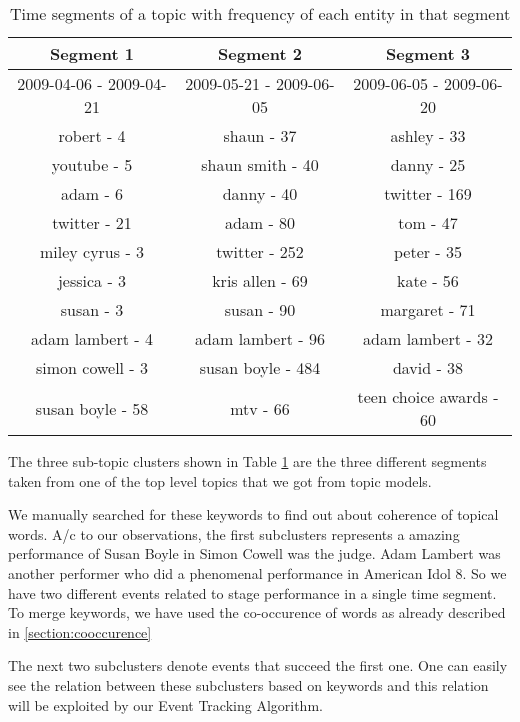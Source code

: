 \begin{table}[h!]
\centering
\begin{tabular}{ c c c }
\hline
Segment 1 & Segment 2 & Segment 3 \\
\hline
2009-04-06 - 2009-04-21& 2009-05-21 - 2009-06-05 & 2009-06-05 - 2009-06-20 \\
\hline
robert - 4 & shaun - 37  & ashley - 33  \\
youtube - 5 & shaun smith - 40  & danny - 25  \\
adam - 6 & danny - 40  & twitter - 169  \\
twitter - 21 & adam - 80  & tom - 47  \\
miley cyrus - 3 & twitter - 252  & peter - 35  \\
jessica - 3 & kris allen - 69  & kate - 56  \\
susan - 3 & susan - 90  & margaret - 71  \\
adam lambert - 4 & adam lambert - 96  & adam lambert - 32  \\
simon cowell - 3 & susan boyle - 484  & david - 38  \\
susan boyle - 58 & mtv - 66  & teen choice awards - 60 \\	
\end{tabular}
\caption{Time segments of a topic with frequency of each entity in that segment}
\label{table:timesegment}
\end{table}


The three sub-topic clusters shown in Table \ref{table:timesegment} are the three different segments taken from one of the top level topics that we got from topic models. 

We manually searched for these keywords to find out about coherence of topical words. A/c to our observations, the first subclusters represents a amazing performance of Susan Boyle in Simon Cowell was the judge. Adam Lambert was another performer who did a phenomenal performance in American Idol 8. So we have two different events related to stage performance in a single time segment. To merge keywords, we have used the co-occurence of words as already described in \ref{section:cooccurence}

The next two subclusters denote events that succeed the first one. One can easily see the relation between these subclusters based on keywords and this relation will be exploited by our Event Tracking Algorithm.
